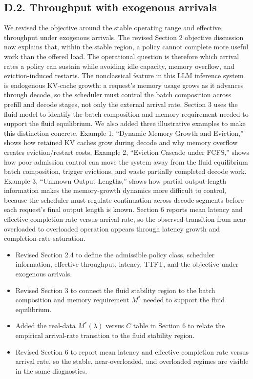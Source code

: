 \subsection*{D.2. Throughput with exogenous arrivals}


\response We revised the objective around the stable operating range and effective throughput under exogenous arrivals. The revised Section 2 objective discussion now explains that, within the stable region, a policy cannot complete more useful work than the offered load. The operational question is therefore which arrival rates a policy can sustain while avoiding idle capacity, memory overflow, and eviction-induced restarts. The nonclassical feature in this LLM inference system is endogenous KV-cache growth: a request's memory usage grows as it advances through decode, so the scheduler must control the batch composition across prefill and decode stages, not only the external arrival rate. Section 3 uses the fluid model to identify the batch composition and memory requirement needed to support the fluid equilibrium. We also added three illustrative examples to make this distinction concrete. Example 1, ``Dynamic Memory Growth and Eviction,'' shows how retained KV caches grow during decode and why memory overflow creates eviction/restart costs. Example 2, ``Eviction Cascade under FCFS,'' shows how poor admission control can move the system away from the fluid equilibrium batch composition, trigger evictions, and waste partially completed decode work. Example 3, ``Unknown Output Lengths,'' shows how partial output-length information makes the memory-growth dynamics more difficult to control, because the scheduler must regulate continuation across decode segments before each request's final output length is known. Section 6 reports mean latency and effective completion rate versus arrival rate, so the observed transition from near-overloaded to overloaded operation appears through latency growth and completion-rate saturation.

\changes
\begin{itemize}
    \item Revised Section 2.4 to define the admissible policy class, scheduler information, effective throughput, latency, TTFT, and the objective under exogenous arrivals.
    \item Revised Section 3 to connect the fluid stability region to the batch composition and memory requirement \(M^*\) needed to support the fluid equilibrium.
    \item Added the real-data \(M^*(\lambda)\) versus \(C\) table in Section 6 to relate the empirical arrival-rate transition to the fluid stability region.
    \item Revised Section 6 to report mean latency and effective completion rate versus arrival rate, so the stable, near-overloaded, and overloaded regimes are visible in the same diagnostics.
\end{itemize}


